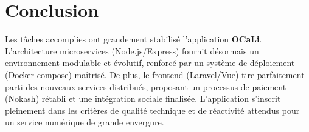 \documentclass[12pt,a4paper]{article}
\begin{document}
\section{Conclusion}
Les tâches accomplies ont grandement stabilisé l'application \textbf{OCaLi}. L'architecture microservices (Node.js/Express) fournit désormais un environnement modulable et évolutif, renforcé par un système de déploiement (Docker compose) maîtrisé. De plus, le frontend (Laravel/Vue) tire parfaitement parti des nouveaux services distribués, proposant un processus de paiement (Nokash) rétabli et une intégration sociale finalisée. 
L'application s'inscrit pleinement dans les critères de qualité technique et de réactivité attendus pour un service numérique de grande envergure.
\end{document}
